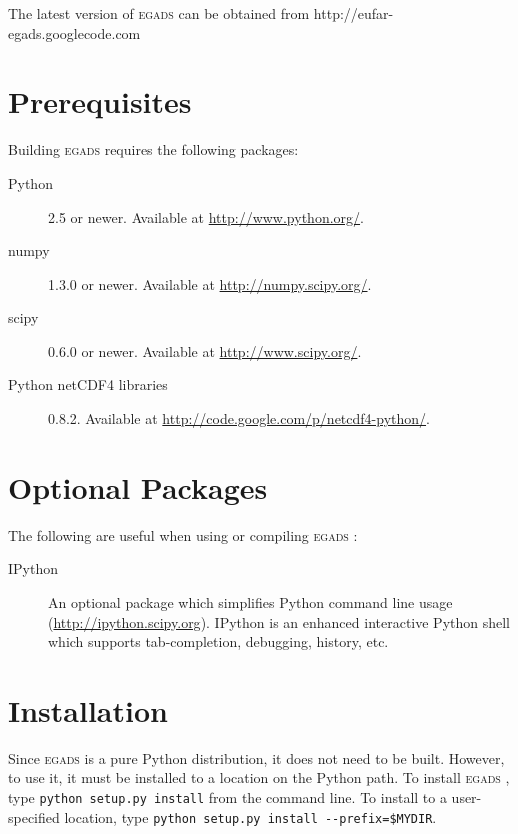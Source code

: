 \documentclass[a4paper,11pt]{report}
\newcommand{\egads}{\textsc{egads} }
\begin{document}
The latest version of \egads can be obtained from http://eufar-egads.googlecode.com

\section{Prerequisites}

Building \egads requires the following packages:

\begin{description}
 \item[Python] 2.5 or newer. Available at \href{http://www.python.org/}{http://www.python.org/}.
 \item[numpy] 1.3.0 or newer. Available at \href{http://numpy.scipy.org/}{http://numpy.scipy.org/}.
 \item[scipy] 0.6.0 or newer. Available at \href{http://www.scipy.org/}{http://www.scipy.org/}.
 \item[Python netCDF4 libraries] 0.8.2. Available at \href{http://code.google.com/p/netcdf4-python/}{http://code.google.com/p/netcdf4-python/}.

\end{description}

\section{Optional Packages}

The following are useful when using or compiling \egads:

\begin{description}
 \item[IPython] An optional package which simplifies Python command line usage 
(\href{http://ipython.scipy.org}{http://ipython.scipy.org}). IPython is an enhanced interactive Python 
shell which supports tab-completion, debugging, history, etc. 

 \end{description}

\section{Installation}
Since \egads is a pure Python distribution, it does not need to be built. However, to use it, it must 
be installed to a location on the Python path. To install \egads, type \verb|python setup.py install| 
from the command line. To install to a user-specified location, type 
\verb|python setup.py install --prefix=$MYDIR|. 
\end{document}
